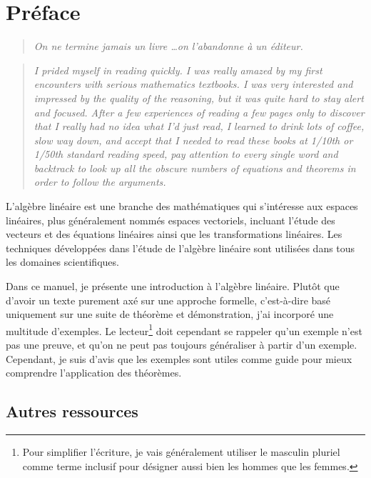\chapter{Préface}

\begin{quote}\small \textit{
On ne termine jamais un livre \ldots on l'abandonne à un éditeur.}
\end{quote}

\begin{quote}\small \textit{
I prided myself in reading quickly. I was really amazed by my first encounters with serious mathematics textbooks. I was very interested and impressed by the quality of the reasoning, but it was quite hard to stay alert and focused. After a few experiences of reading a few pages only to discover that I really had no idea what I'd just read, I learned to drink lots of coffee, slow way down, and accept that I needed to read these books at 1/10th or 1/50th standard reading speed, pay attention to every single word and backtrack to look up all the obscure numbers of equations and theorems in order to follow the arguments.}
\end{quote}

L'algèbre linéaire est une branche des mathématiques qui s'intéresse aux espaces linéaires, plus généralement nommés espaces vectoriels, incluant l'étude des vecteurs et des équations linéaires ainsi que les transformations linéaires.  
Les techniques développées dans l'étude de l'algèbre linéaire 
sont utilisées dans tous les domaines scientifiques.

Dans ce manuel, je présente une introduction à l'algèbre linéaire. 
Plutôt que d'avoir un texte purement axé sur une approche formelle, 
c'est-à-dire basé uniquement sur une suite de théorème et démonstration,
j'ai incorporé une multitude d'exemples.  Le lecteur\footnote{Pour simplifier l'écriture, je vais généralement utiliser le masculin pluriel comme terme inclusif pour désigner aussi bien
les hommes que les femmes.} doit cependant se rappeler qu'un exemple n'est pas une preuve, et qu'on ne peut pas toujours généraliser
à partir d'un exemple.  Cependant, je suis d'avis que les exemples sont utiles comme guide pour mieux comprendre
l'application des théorèmes.

\section{Autres ressources}

